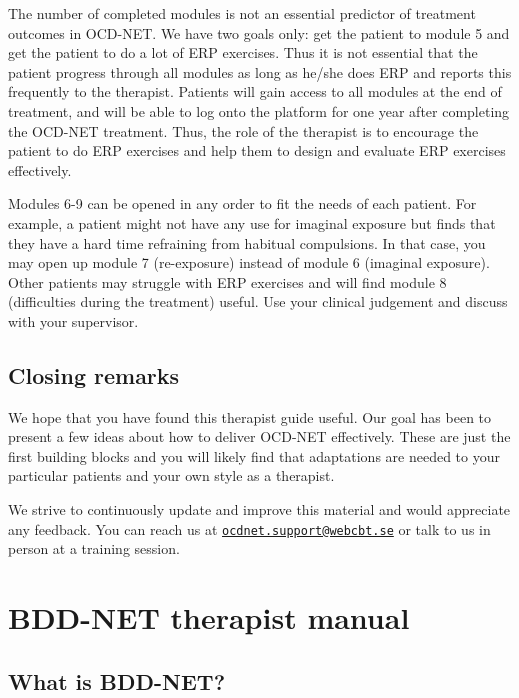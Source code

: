 \documentclass[]{book}
\begin{document}
The number of completed modules is not an essential predictor of treatment outcomes in OCD-NET. We have two goals only: get the patient to module 5 and get the patient to do a lot of ERP exercises. Thus it is not essential that the patient progress through all modules as long as he/she does ERP and reports this frequently to the therapist. Patients will gain access to all modules at the end of treatment, and will be able to log onto the platform for one year after completing the OCD-NET treatment. Thus, the role of the therapist is to encourage the patient to do ERP exercises and help them to design and evaluate ERP exercises effectively.

Modules 6-9 can be opened in any order to fit the needs of each patient. For example, a patient might not have any use for imaginal exposure but finds that they have a hard time refraining from habitual compulsions. In that case, you may open up module 7 (re-exposure) instead of module 6 (imaginal exposure). Other patients may struggle with ERP exercises and will find module 8 (difficulties during the treatment) useful. Use your clinical judgement and discuss with your supervisor.

\hypertarget{closing-remarks}{%
\section{Closing remarks}\label{closing-remarks}}

We hope that you have found this therapist guide useful. Our goal has been to present a few ideas about how to deliver OCD-NET effectively. These are just the first building blocks and you will likely find that adaptations are needed to your particular patients and your own style as a therapist.

We strive to continuously update and improve this material and would appreciate any feedback. You can reach us at \href{mailto:ocdnet.support@webcbt.se}{\nolinkurl{ocdnet.support@webcbt.se}} or talk to us in person at a training session.

\hypertarget{bdd-net-therapist-manual}{%
\chapter{BDD-NET therapist manual}\label{bdd-net-therapist-manual}}

\hypertarget{what-is-bdd-net}{%
\section{What is BDD-NET?}\label{what-is-bdd-net}}
\end{document}
